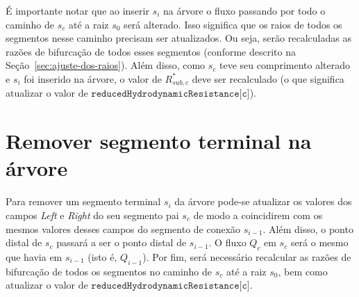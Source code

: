 \begin{apendices}
É importante notar que ao inserir $s_{i}$ na árvore o fluxo passando por todo o caminho de 
$s_c$ até a raiz $s_0$ será alterado. Isso significa que os raios de 
todos os segmentos nesse caminho precisam ser atualizados. Ou seja, serão 
recalculadas as razões de bifurcação de todos esses segmentos (conforme descrito na Seção~\ref{sec:ajuste-dos-raios}).
Além disso, como $s_c$ teve seu comprimento alterado e $s_i$ foi inserido na árvore, o valor de 
$R^*_{sub,c}$ deve ser recalculado (o que significa atualizar o valor de $\texttt{reducedHydrodynamicResistance[c]}$).

  \section{Remover segmento terminal na árvore}\label{sec:remover-segmento-terminal}

Para remover um segmento terminal $s_i$ da árvore pode-se atualizar 
os valores dos campos \textit{Left} e \textit{Right} do seu segmento pai $s_c$
de modo a coincidirem com os mesmos valores desses campos do segmento de conexão $s_{i-1}$. 
Além disso, o ponto distal de $s_c$ passará a ser o ponto distal de $s_{i-1}$. 
O fluxo $Q_{c}$ em $s_{c}$ será o mesmo que havia em $s_{i-1}$ (isto é, $Q_{i-1}$). 
Por fim, será necessário recalcular 
as razões de bifurcação de todos os segmentos no caminho de $s_c$ até a raiz $s_0$, 
bem como atualizar o valor de $\texttt{reducedHydrodynamicResistance[c]}$.

\end{apendices}